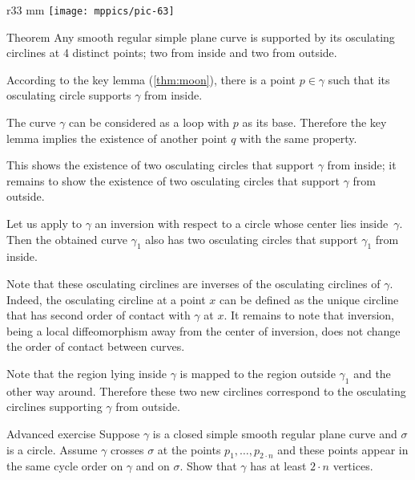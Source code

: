 \documentclass{article}
\begin{document}
{

\begin{wrapfigure}{r}{33 mm}
\vskip-0mm
\centering
\texttt{[image: mppics/pic-63]}
\vskip0mm
\end{wrapfigure}

\begin{thm}{Theorem}\label{thm:4-vert}
Any smooth regular simple plane curve is supported by its osculating circlines at 4 distinct points; two from inside and two from outside.
\end{thm}

According to the key lemma (\ref{thm:moon}), there is a point $p\in\gamma$ such that its osculating circle supports $\gamma$ from inside.

The curve $\gamma$ can be considered as a loop with $p$ as its base.
Therefore the key lemma implies the existence of another point $q$ with the same property.

}

This shows the existence of two osculating circles that support $\gamma$ from inside;
it remains to show the existence of two osculating circles that support $\gamma$ from outside.

Let us apply to $\gamma$ an inversion with respect to a circle whose center lies inside~$\gamma$.
Then the obtained curve $\gamma_1$ also has  two osculating circles that support $\gamma_1$ from inside.

Note that these osculating circlines are inverses of the osculating circlines of $\gamma$.
Indeed, the osculating circline at a point $x$ can be defined as the unique circline that has second order of contact with $\gamma$ at $x$.
It remains to note that inversion, being a local diffeomorphism away from the center of inversion, does not change the order of contact between curves.

Note that the region lying inside $\gamma$ is mapped to the region outside $\gamma_1$ and the other way around.
Therefore these two new circlines correspond to the osculating circlines supporting $\gamma$ from outside.
\qeds

\begin{thm}{Advanced exercise}\label{ex:curve-crosses-circle}
Suppose $\gamma$ is a closed simple smooth regular plane curve and $\sigma$ is a circle.
Assume $\gamma$ crosses $\sigma$ at the points $p_1,\dots,p_{2{\cdot} n}$ and these points appear in the same cycle order on $\gamma$ and on $\sigma$.
Show that $\gamma$ has at least $2\cdot n$ vertices.
\end{thm}
\end{document}
